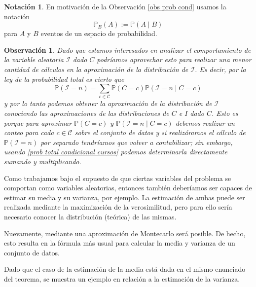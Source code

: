 \documentclass[11pt,a4paper]{book}
\newtheorem{observacion}[teorema]{Observaci\'on}
\theoremstyle{definition}%
\newtheorem{notacion}[teorema]{Notaci\'on}
\newcommand{\Probsymb}{\mathds{P}}
\newcommand{\Prob}[1]{\mathds{P}\left( #1 \right)}
\begin{document}
            \begin{notacion}
                En motivación de la Observación \ref{obs prob cond} usamos la notación
                \begin{equation}\label{notacion cond}
                    \Probsymb_{B}(A):=\Prob{A\mid B}
                \end{equation}
                para $A$ y $B$ eventos de un espacio de probabilidad.
            \end{notacion}
            \begin{observacion}
                Dado que estamos interesados en analizar el comportamiento de la variable aleatoria $\mathcal{I}$ dado $C$ podríamos aprovechar esto para realizar una menor cantidad de cálculos en la aproximación de la distribución de $\mathcal{I}$. Es decir, por la ley de la probabilidad total es cierto que
                \begin{equation}\label{prob total condicional cursos}
                    \Prob{\mathcal{I}=n}= \sum_{c\in\mathcal{C}}\Prob{C=c}\Prob{\mathcal{I}=n\mid C=c}
                \end{equation}
                y por lo tanto podemos obtener la aproximación de la distribución de $\mathcal{I}$ conociendo las aproximaciones de las distribuciones de $C$ e $I$ dado $C$. Esto es porque para aproximar $\Prob{C=c}$ y $\Prob{\mathcal{I}=n\mid C=c}$ debemos realizar un conteo para cada $c\in \mathcal{C}$ sobre el conjunto de datos y si realizáramos el cálculo de $\Prob{\mathcal{I}=n}$ por separado tendríamos que volver a contabilizar; sin embargo, usando \ref{prob total condicional cursos} podemos determinarla directamente sumando y multiplicando.
            \end{observacion}

            Como trabajamos bajo el supuesto de que ciertas variables del problema se comportan como variables aleatorias, entonces también deberíamos ser capaces de estimar su media y su varianza, por ejemplo. La estimación de ambas puede ser realizada mediante la maximización de la verosimilitud, pero para ello sería necesario conocer la distribución (teórica) de las mismas.

            Nuevamente, mediante una aproximación de Montecarlo será posible. De hecho, esto resulta en la fórmula más usual para calcular la media y varianza de un conjunto de datos.

            Dado que el caso de la estimación de la media está dada en el mismo enunciado del teorema, se muestra un ejemplo en relación a la estimación de la varianza.
\end{document}
